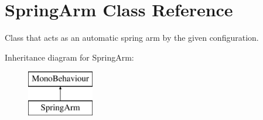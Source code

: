 \hypertarget{class_spring_arm}{}\section{Spring\+Arm Class Reference}
\label{class_spring_arm}


Class that acts as an automatic spring arm by the given configuration.  


Inheritance diagram for Spring\+Arm\+:\begin{figure}[H]
\begin{center}
\leavevmode
\includegraphics[height=2.000000cm]{class_spring_arm}
\end{center}
\end{figure}
